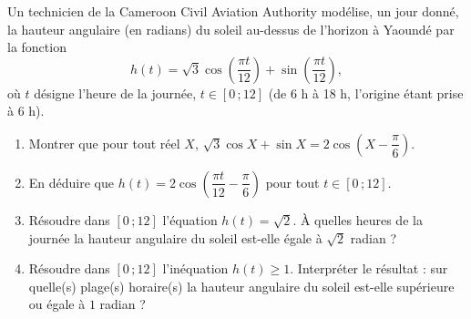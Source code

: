 \documentclass[11pt]{article}
\begin{document}
\begin{exercice}
Un technicien de la Cameroon Civil Aviation Authority modélise, un jour donné, la hauteur angulaire (en radians) du soleil au-dessus de l'horizon à Yaoundé par la fonction
\[h(t)=\sqrt{3}\cos\left(\dfrac{\pi t}{12}\right)+\sin\left(\dfrac{\pi t}{12}\right),\]
où $t$ désigne l'heure de la journée, $t\in[0\,;12]$ (de 6 h à 18 h, l'origine étant prise à 6 h).
\begin{enumerate}
\item Montrer que pour tout réel $X$, $\sqrt{3}\cos X+\sin X=2\cos\left(X-\dfrac{\pi}{6}\right)$.
\item En déduire que $h(t)=2\cos\left(\dfrac{\pi t}{12}-\dfrac{\pi}{6}\right)$ pour tout $t\in[0\,;12]$.
\item Résoudre dans $[0\,;12]$ l'équation $h(t)=\sqrt{2}$. À quelles heures de la journée la hauteur angulaire du soleil est-elle égale à $\sqrt{2}$ radian ?
\item Résoudre dans $[0\,;12]$ l'inéquation $h(t)\geq 1$. Interpréter le résultat : sur quelle(s) plage(s) horaire(s) la hauteur angulaire du soleil est-elle supérieure ou égale à $1$ radian ?
\end{enumerate}
\end{exercice}
\end{document}
